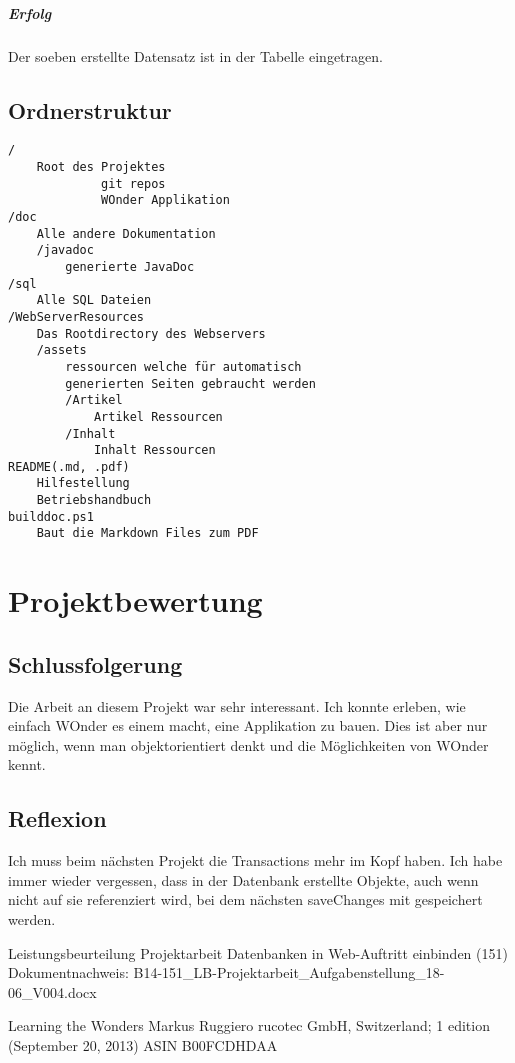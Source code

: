 \documentclass[a4paper, 11pt]{article}
\begin{document}
\subparagraph{Erfolg}

Der soeben erstellte Datensatz ist in der Tabelle eingetragen.


\clearpage
\subsection{Ordnerstruktur}

\begin{verbatim}
/
    Root des Projektes
             git repos
             WOnder Applikation
/doc
    Alle andere Dokumentation
    /javadoc
        generierte JavaDoc
/sql
    Alle SQL Dateien
/WebServerResources
    Das Rootdirectory des Webservers
    /assets
        ressourcen welche für automatisch
        generierten Seiten gebraucht werden
        /Artikel
            Artikel Ressourcen
        /Inhalt
            Inhalt Ressourcen
README(.md, .pdf)
	Hilfestellung
	Betriebshandbuch
builddoc.ps1
	Baut die Markdown Files zum PDF
\end{verbatim}

\section{Projektbewertung}

\subsection{Schlussfolgerung}

Die Arbeit an diesem Projekt war sehr interessant. Ich konnte erleben, wie einfach WOnder es einem macht, eine Applikation zu bauen. Dies ist aber nur möglich, wenn man objektorientiert denkt und die Möglichkeiten von WOnder kennt.

\subsection{Reflexion}

Ich muss beim nächsten Projekt die Transactions mehr im Kopf haben. Ich habe immer wieder vergessen, dass in der Datenbank erstellte Objekte, auch wenn nicht auf sie referenziert wird, bei dem nächsten saveChanges mit gespeichert werden.

\begin{thebibliography}{9}
Leistungsbeurteilung Projektarbeit
Datenbanken in Web-Auftritt einbinden (151)
Dokumentnachweis: B14-151\_LB-Projektarbeit\_Aufgabenstellung\_18-06\_V004.docx

Learning the Wonders
Markus Ruggiero
rucotec GmbH, Switzerland; 1 edition (September 20, 2013)
ASIN B00FCDHDAA

\end{thebibliography}
\end{document}
